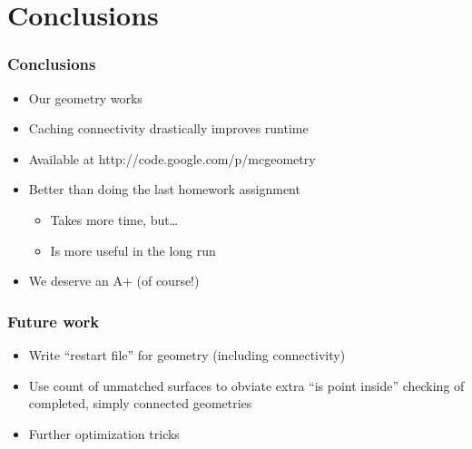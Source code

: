 \documentclass{beamer}
\begin{document}
\section{Conclusions}

\begin{frame}
  \frametitle{Conclusions}
  \begin{itemize}
	 \item Our geometry works
   \item Caching connectivity drastically improves runtime
   
     \item Available at http://code.google.com/p/mcgeometry
     \item Better than doing the last homework assignment
         \begin{itemize}
             \item Takes more time, but\dots
             \item Is more useful in the long run
         \end{itemize}
	 \item We deserve an A+ (of course!)
  \end{itemize}
\end{frame}

\begin{frame}
  \frametitle{Future work}
  \begin{itemize}
	 \item Write ``restart file'' for geometry (including connectivity)
   \item Use count of unmatched surfaces to obviate extra ``is point inside''
     checking of completed, simply connected geometries
   \item Further optimization tricks
  \end{itemize}
\end{frame}

\end{document}
